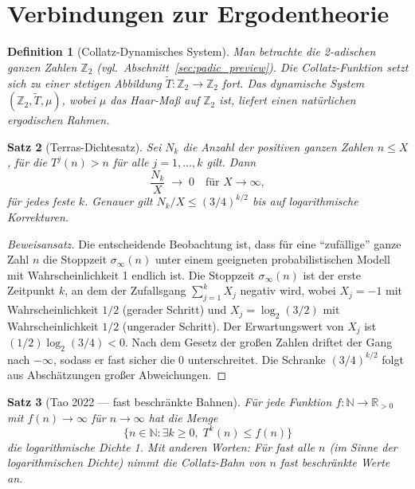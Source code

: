 \documentclass[12pt,a4paper]{article}
\newtheorem{theorem}{Satz}[section]
\newtheorem{definition}[theorem]{Definition}
\begin{document}
\section{Verbindungen zur Ergodentheorie}

\begin{definition}[Collatz-Dynamisches System]\label{def:shift}
Man betrachte die 2-adischen ganzen Zahlen $\mathbb{Z}_2$ (vgl.\ Abschnitt~\ref{sec:padic_preview}).
Die Collatz-Funktion setzt sich zu einer stetigen Abbildung
$\tilde{T}\colon \mathbb{Z}_2 \to \mathbb{Z}_2$
fort. Das dynamische System $(\mathbb{Z}_2, \tilde{T}, \mu)$, wobei $\mu$ das
Haar-Maß auf $\mathbb{Z}_2$ ist, liefert einen natürlichen ergodischen Rahmen.
\end{definition}

\begin{theorem}[Terras-Dichtesatz]\label{thm:terras}
Sei $N_k$ die Anzahl der positiven ganzen Zahlen $n \leq X$, für die $T^j(n) > n$ für
alle $j = 1, \ldots, k$ gilt. Dann
\[
  \frac{N_k}{X} \;\longrightarrow\; 0 \quad \text{für } X \to \infty,
\]
für jedes feste $k$. Genauer gilt $N_k/X \leq (3/4)^{k/2}$ bis auf logarithmische
Korrekturen.
\end{theorem}

\begin{proof}[Beweisansatz]
Die entscheidende Beobachtung ist, dass für eine ``zufällige'' ganze Zahl $n$ die
Stoppzeit $\sigma_\infty(n)$ unter einem geeigneten probabilistischen Modell mit
Wahrscheinlichkeit 1 endlich ist. Die Stoppzeit $\sigma_\infty(n)$ ist der erste
Zeitpunkt $k$, an dem der Zufallsgang $\sum_{j=1}^k X_j$ negativ wird, wobei
$X_j = -1$ mit Wahrscheinlichkeit $1/2$ (gerader Schritt) und
$X_j = \log_2(3/2)$ mit Wahrscheinlichkeit $1/2$ (ungerader Schritt).
Der Erwartungswert von $X_j$ ist $(1/2)\log_2(3/4) < 0$. Nach dem Gesetz der
großen Zahlen driftet der Gang nach $-\infty$, sodass er fast sicher die 0 unterschreitet.
Die Schranke $(3/4)^{k/2}$ folgt aus Abschätzungen großer Abweichungen.
\end{proof}

\begin{theorem}[Tao 2022 — fast beschränkte Bahnen]\label{thm:tao}
Für jede Funktion $f\colon \mathbb{N} \to \mathbb{R}_{>0}$ mit $f(n) \to \infty$ für
$n \to \infty$ hat die Menge
\[
  \bigl\{ n \in \mathbb{N} : \exists k \geq 0,\; T^k(n) \leq f(n) \bigr\}
\]
die logarithmische Dichte 1. Mit anderen Worten: Für fast alle $n$ (im Sinne der
logarithmischen Dichte) nimmt die Collatz-Bahn von $n$ fast beschränkte Werte an.
\end{theorem}
\end{document}
